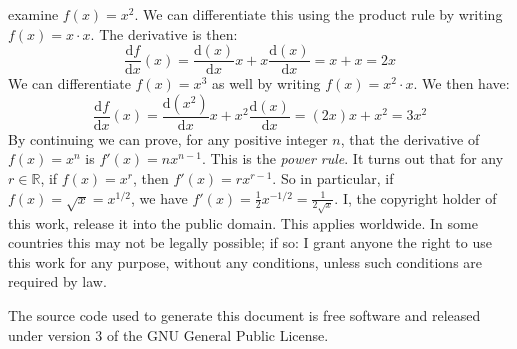 \documentclass{article}
\theoremstyle{plain}
\begin{document}
    examine $f(x)=x^{2}$. We can differentiate this using the product rule
    by writing $f(x)=x\cdot{x}$. The derivative is then:
    \begin{equation}
        \frac{\textrm{d}f}{\textrm{d}x}(x)=
        \frac{\textrm{d}(x)}{\textrm{d}x}x+x\frac{\textrm{d}(x)}{\textrm{d}x}
        =x+x=2x
    \end{equation}
    We can differentiate $f(x)=x^{3}$ as well by writing
    $f(x)=x^{2}\cdot{x}$. We then have:
    \begin{equation}
        \frac{\textrm{d}f}{\textrm{d}x}(x)=
        \frac{\textrm{d}(x^{2})}{\textrm{d}x}x
            +x^{2}\frac{\textrm{d}(x)}{\textrm{d}x}
        =(2x)x+x^{2}=3x^{2}
    \end{equation}
    By continuing we can prove, for any positive integer $n$, that the
    derivative of $f(x)=x^{n}$ is $f'(x)=nx^{n-1}$. This is the
    \textit{power rule}. It turns out that for any $r\in\mathbb{R}$, if
    $f(x)=x^{r}$, then $f'(x)=rx^{r-1}$. So in particular, if
    $f(x)=\sqrt{x}=x^{1/2}$, we have
    $f'(x)=\frac{1}{2}x^{-1/2}=\frac{1}{2\sqrt{x}}$.
    \newpage
    I, the copyright holder of this work, release it into the public domain.
    This applies worldwide. In some countries this may not be legally possible;
    if so: I grant anyone the right to use this work for any purpose, without
    any conditions, unless such conditions are required by law.
    \par\hfill\par
    The source code used to generate this document is free software and released
    under version 3 of the GNU General Public License.
\end{document}
